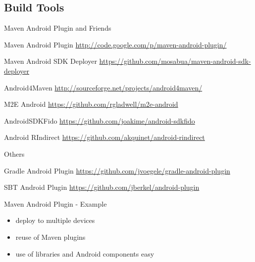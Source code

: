 \documentclass[aspectratio=169]{beamer}
\newcommand{\surl}[1] {{\tiny \url{#1}}}
\begin{document}
  \subsection{Build Tools}

    \begin{frame}{Maven Android Plugin and Friends}
      \begin{description}
       \item Maven Android Plugin \surl{http://code.google.com/p/maven-android-plugin/}
       \item Maven Android SDK Deployer \surl{https://github.com/mosabua/maven-android-sdk-deployer}
       \item Android4Maven \surl{http://sourceforge.net/projects/android4maven/}
       \item M2E Android \surl{https://github.com/rgladwell/m2e-android}
       \item AndroidSDKFido \surl{https://github.com/joakime/android-sdkfido}
       \item Android RIndirect \surl{https://github.com/akquinet/android-rindirect}
      \end{description}

    \end{frame}

    \begin{frame}{Others}
      \begin{description}
       \item Gradle Android Plugin \surl{https://github.com/jvoegele/gradle-android-plugin}
       \item SBT Android Plugin \surl{https://github.com/jberkel/android-plugin}
      \end{description}
    \end{frame}

    \begin{frame}{Maven Android Plugin - Example}
      \begin{itemize}
       \item deploy to multiple devices
       \item reuse of Maven plugins
       \item use of libraries and Android components easy
      \end{itemize}
    \end{frame}
\end{document}
